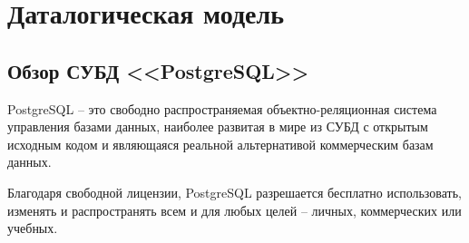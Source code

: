 \section{Даталогическая модель}\label{sec:datalogical-model}


\renewcommand{\tab}{\hspace{1cm}}



\subsection{Обзор СУБД <<PostgreSQL>>}

PostgreSQL \cite{postgrespro} -- это свободно распространяемая объектно-реляционная система управления базами данных, наиболее развитая в мире из СУБД с открытым исходным кодом и являющаяся реальной альтернативой коммерческим базам данных.

Благодаря свободной лицензии, PostgreSQL разрешается бесплатно использовать, изменять и распространять всем и для любых целей -- личных, коммерческих или учебных.

